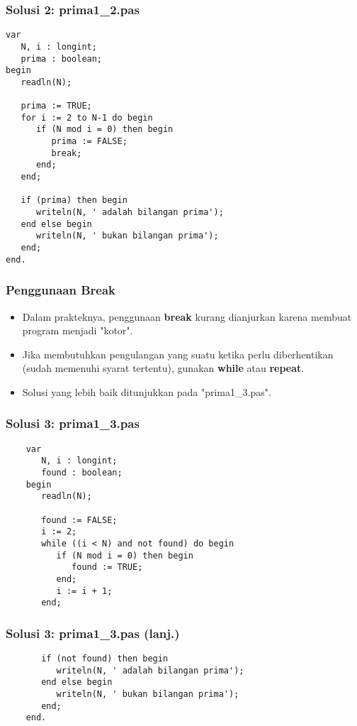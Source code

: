 \documentclass{beamer}
\begin{document}
\begin{frame}[fragile]
\frametitle{Solusi 2: prima1\_2.pas}
\begin{lstlisting}
var
   N, i : longint;
   prima : boolean;
begin
   readln(N);

   prima := TRUE;
   for i := 2 to N-1 do begin
      if (N mod i = 0) then begin
         prima := FALSE;
         break;
      end;
   end;

   if (prima) then begin
      writeln(N, ' adalah bilangan prima');
   end else begin
      writeln(N, ' bukan bilangan prima');
   end;
end.
\end{lstlisting}
\end{frame}

\begin{frame}
\frametitle{Penggunaan Break}
\begin{itemize}
	\item Dalam prakteknya, penggunaan \textbf{break} kurang dianjurkan karena membuat program menjadi "kotor".
	\item Jika membutuhkan pengulangan yang suatu ketika perlu diberhentikan (sudah memenuhi syarat tertentu), gunakan \textbf{while} atau \textbf{repeat}.
	\item Solusi yang lebih baik ditunjukkan pada "prima1\_3.pas".
\end{itemize}
\end{frame}

\begin{frame}[fragile]
\frametitle{Solusi 3: prima1\_3.pas}
\begin{lstlisting}
	var
	   N, i : longint;
	   found : boolean;
	begin
	   readln(N);

	   found := FALSE;
	   i := 2;
	   while ((i < N) and not found) do begin
	      if (N mod i = 0) then begin
	         found := TRUE;
	      end;
	      i := i + 1;
	   end;
\end{lstlisting}
\end{frame}

\begin{frame}[fragile]
\frametitle{Solusi 3: prima1\_3.pas (lanj.)}
\begin{lstlisting}
	   if (not found) then begin
	      writeln(N, ' adalah bilangan prima');
	   end else begin
	      writeln(N, ' bukan bilangan prima');
	   end;
	end.
\end{lstlisting}
\end{frame}
\end{document}
